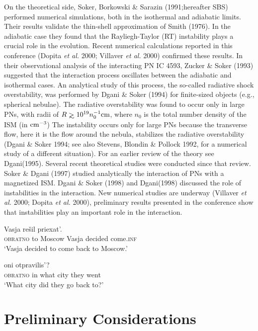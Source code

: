 \documentclass{article}
\def \cm{\rm{cm}}
\def \gae{\mathrel{>\kern-1.0em\lower0.9ex\hbox{$\sim$}}}
\def \cm{\rm{cm}}
\def \gae{\mathrel{>\kern-1.0em\lower0.9ex\hbox{$\sim$}}}
\begin{document}
On the theoretical side, Soker, Borkowski \& Sarazin (1991;hereafter
SBS) performed numerical simulations, both in the isothermal and adiabatic 
limits.
Their results validate the thin-shell approximation of Smith (1976).
In the adiabatic case they found that the Rayliegh-Taylor (RT)
instability plays a crucial role in the evolution.
Recent numerical calculations reported in this conference 
(Dopita {\it et al.} 2000; Villaver {\it et al.} 2000) confirmed these 
results. In their observational analysis of the interacting PN IC 4593,
Zucker \& Soker (1993) suggested that the interaction process oscillates
between the adiabatic and isothermal cases.
An analytical study of this process, the so-called radiative shock
overstability, was performed by Dgani \& Soker (1994) for finite-sized
objects (e.g., spherical nebulae).
The radiative overstability was found to occur only in large
PNs, with radii of $R \gae 10^{19} n_0^{-1} \cm$, where $n_0$ is the
total number density of the ISM (in $\cm^{-3}$)
The instability occurs only for large PNs because  the transverse
flow, here it is the flow around the nebula, stabilizes the radiative
overstability (Dgani \& Soker 1994; see also
Stevens, Blondin \& Pollock 1992, for a numerical study of a different
situation). 
For an earlier review of the theory see Dgani(1995).
Several recent theoretical studies were conducted since that review.  
Soker \& Dgani (1997) studied analytically the interaction
of PNs with a magnetized ISM. Dgani \& Soker (1998) and Dgani(1998)  discussed
the role of instabilities in the interaction. 
New numerical studies are underway (Villaver {\it et al.} 2000; 
Dopita {\it et al.} 2000), preliminary results presented in the conference
show that instabilities play an important role in the interaction.

 \ea\label{ex:bondarenko:fn9i}
   Vasja rešil priexat’.\\
  {} \textsc{obratno} to Moscow Vasja decided come.\textsc{inf}\\
  \glt `Vasja decided to come back to Moscow.'
  \z

  \ea\label{ex:bondarenko:fn9ii}
     oni otpravilis’?\\
    {} \textsc{obratno} in what city they went\\
    \glt `What city did they go back to?'
    \z
    

\section{Preliminary Considerations}
\end{document}
